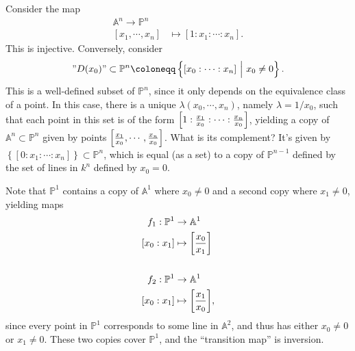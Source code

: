 \begin{remark}

Consider the map
\begin{align*}  
{\mathbb{A}}^n \to {\mathbb{P}}^n \\
{\left[ {x_1, \cdots, x_n} \right]} &\mapsto {\left[ {1: x_1 : \cdots : x_n} \right]}
.\end{align*}
This is injective. Conversely, consider
\begin{align*}  
"D(x_0)" \subset {\mathbb{P}}^n \coloneqq\left\{{{\left[ {x_0 : \cdots : x_n} \right]} {~\mathrel{\Big|}~}x_0\neq 0}\right\}
.\end{align*}
This is a well-defined subset of \({\mathbb{P}}^n\), since it only
depends on the equivalence class of a point. In this case, there is a
unique \(\lambda(x_0, \cdots, x_n)\), namely \(\lambda = 1/x_0\), such
that each point in this set is of the form
\({\left[ {1: {x_1\over x_0} : \cdots : {x_n \over x_0}} \right]}\),
yielding a copy of \({\mathbb{A}}^n\subset {\mathbb{P}}^n\) given by
points \({\left[ {{x_1\over x_0}, \cdots, {x_n\over x_0}} \right]}\).
What is its complement? It's given by
\(\left\{{{\left[ {0: x_1: \cdots : x_n} \right]}}\right\} \subset {\mathbb{P}}^n\),
which is equal (as a set) to a copy of \({\mathbb{P}}^{n-1}\) defined by
the set of lines in \(k^n\) defined by \(x_0 = 0\).

\end{remark}

\begin{example}[?]

Note that \({\mathbb{P}}^1\) contains a copy of \({\mathbb{A}}^1\) where
\(x_0 \neq 0\) and a second copy where \(x_1 \neq 0\), yielding maps
\begin{align*}  
f_1: {\mathbb{P}}^1 &\to {\mathbb{A}}^1 \\
{\left[ {x_0: x_1} \right]} &\mapsto {\left[ {{x_0 \over x_1}} \right]} \\ \\
f_2: {\mathbb{P}}^1 &\to {\mathbb{A}}^1 \\
{\left[ {x_0: x_1} \right]} &\mapsto {\left[ {{x_1 \over x_0}} \right]}
,\end{align*}
since every point in \({\mathbb{P}}^1\) corresponds to some line in
\({\mathbb{A}}^2\), and thus has either \(x_0\neq 0\) or \(x_1 \neq 0\).
These two copies cover \({\mathbb{P}}^1\), and the ``transition map'' is
inversion.

\end{example}

